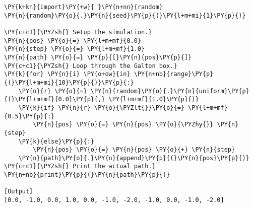 \begin{Verbatim}[label=\makebox{\href{https://github.com/unipi-physics-labs/lab1-notes/tree/main/snippy/galton_box.py}{https://github.com/.../galton\_box.py}},commandchars=\\\{\}]
\PY{k+kn}{import}\PY{+w}{ }\PY{n+nn}{random}
\PY{n}{random}\PY{o}{.}\PY{n}{seed}\PY{p}{(}\PY{l+m+mi}{1}\PY{p}{)}

\PY{c+c1}{\PYZsh{} Setup the simulation.}
\PY{n}{pos} \PY{o}{=} \PY{l+m+mf}{0.0}
\PY{n}{step} \PY{o}{=} \PY{l+m+mf}{1.0}
\PY{n}{path} \PY{o}{=} \PY{p}{[}\PY{n}{pos}\PY{p}{]}
\PY{c+c1}{\PYZsh{} Loop through the Galton box.}
\PY{k}{for} \PY{n}{i} \PY{o+ow}{in} \PY{n+nb}{range}\PY{p}{(}\PY{l+m+mi}{10}\PY{p}{)}\PY{p}{:}
    \PY{n}{r} \PY{o}{=} \PY{n}{random}\PY{o}{.}\PY{n}{uniform}\PY{p}{(}\PY{l+m+mf}{0.0}\PY{p}{,} \PY{l+m+mf}{1.0}\PY{p}{)}
    \PY{k}{if} \PY{n}{r} \PY{o}{\PYZlt{}}\PY{o}{=} \PY{l+m+mf}{0.5}\PY{p}{:}
        \PY{n}{pos} \PY{o}{=} \PY{n}{pos} \PY{o}{\PYZhy{}} \PY{n}{step}
    \PY{k}{else}\PY{p}{:}
        \PY{n}{pos} \PY{o}{=} \PY{n}{pos} \PY{o}{+} \PY{n}{step}
    \PY{n}{path}\PY{o}{.}\PY{n}{append}\PY{p}{(}\PY{n}{pos}\PY{p}{)}
\PY{c+c1}{\PYZsh{} Print the actual path.}
\PY{n+nb}{print}\PY{p}{(}\PY{n}{path}\PY{p}{)}

[Output]
[0.0, -1.0, 0.0, 1.0, 0.0, -1.0, -2.0, -1.0, 0.0, -1.0, -2.0]
\end{Verbatim}
